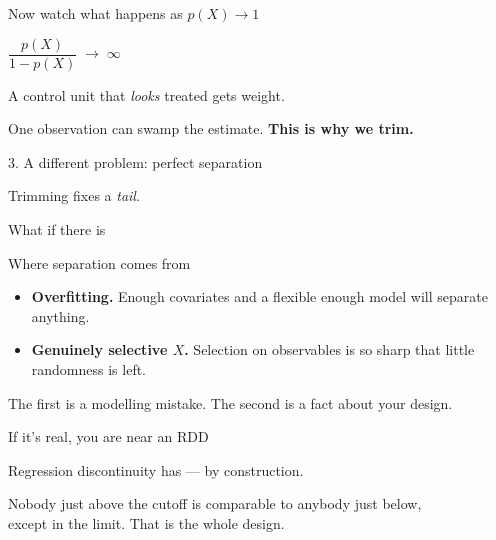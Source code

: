 \documentclass[aspectratio=169,11pt]{beamer}
\begin{document}
\begin{frame}{Now watch what happens as $p(X) \rightarrow 1$}
\vspace{1.2em}
\begin{center}
\Large
$\dfrac{p(X)}{1-p(X)} \;\longrightarrow\; \infty$
\end{center}
\vspace{1.2em}
\begin{center}
A control unit that \textit{looks} treated gets  weight.
\end{center}
\vspace{1em}
\begin{center}\color{warmgray}
One observation can swamp the estimate. \;\textbf{This is why we trim.}
\end{center}
\end{frame}

\begin{frame}{3. \;A different problem: perfect separation}
\vspace{1.6em}
\begin{center}
\Large
Trimming fixes a \textit{tail}.
\end{center}
\vspace{1.2em}
\begin{center}
\Large
What if there is 
\end{center}
\end{frame}

\begin{frame}{Where separation comes from}
\vspace{1.2em}
\begin{itemize}\setlength\itemsep{0.7em}
  \item \textbf{Overfitting.} \;Enough covariates and a flexible enough model will separate anything.
  \item \textbf{Genuinely selective $X$.} \;Selection on observables is so sharp that little randomness is left.
\end{itemize}
\vspace{1.2em}
\begin{center}\color{warmgray}
The first is a modelling mistake. \;The second is a fact about your design.
\end{center}
\end{frame}

\begin{frame}{If it's real, you are near an RDD}
\vspace{1.4em}
\begin{center}
\Large
Regression discontinuity has  --- by construction.
\end{center}
\vspace{1.4em}
\begin{center}\color{warmgray}
Nobody just above the cutoff is comparable to anybody just below, \\ except in the limit. \;That is the whole design.
\end{center}
\end{frame}
\end{document}
